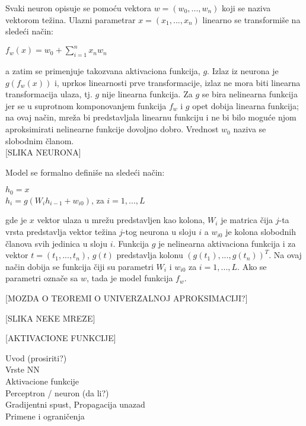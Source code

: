 \par
Svaki neuron opisuje se pomoću vektora $w = (w_0, ..., w_n)$ koji se naziva vektorom težina. Ulazni parametrar $x = (x_1, ..., x_n)$ linearno se transformiše na sledeći način:
\begin{center}
	$f_w(x) = w_0 + \sum_{i=1}^{n} x_nw_n $
\end{center}
a zatim se primenjuje takozvana aktivaciona funkcija, $g$. Izlaz iz neurona je $g(f_w(x))$ i, uprkos linearnosti prve transformacije, izlaz ne mora biti linearna transformacija ulaza, tj. $g$ nije linearna funkcija. Za $g$ se bira nelinearna funkcija jer se u suprotnom komponovanjem funkcija $f_w$ i $g$ opet dobija linearna funkcija; na ovaj način, mreža bi predstavljala linearnu funkciju i ne bi bilo moguće njom aproksimirati nelinearne funkcije dovoljno dobro. Vrednost $w_0$ naziva se slobodnim članom. \\

[SLIKA NEURONA]

Model se formalno definiše na sledeći način:
\begin{center}
	$ h_0 = x $  \\
	$ h_i = g(W_ih_{i-1} + w_{i0})$, za $i=1, ..., L$
\end{center}
gde je $x$ vektor ulaza u mrežu predstavljen kao kolona, $W_i$ je matrica čija $j$-ta vrsta predstavlja vektor težina $j$-tog neurona u sloju $i$ a $w_{i0}$ je kolona slobodnih članova svih jedinica u sloju $i$. Funkcija $g$ je nelinearna aktivaciona funkcija i za vektor $t=(t_1, ..., t_n)$, $g(t)$ predstavlja kolonu $(g(t_1), ..., g(t_n))^T$. Na ovaj način dobija se funkcija čiji su parametri $W_i$ i $w_{i0}$ za $i=1,...,L$. Ako se parametri označe sa $w$, tada je model funkcija $f_w$.  

[MOZDA O TEOREMI O UNIVERZALNOJ APROKSIMACIJI?]

[SLIKA NEKE MREZE]



[AKTIVACIONE FUNKCIJE]

Uvod  (prosiriti?) \\
Vrste NN \\
Aktivacione funkcije \\
Perceptron / neuron (da li?) \\
Gradijentni spust, Propagacija unazad \\
Primene i ograničenja \\
